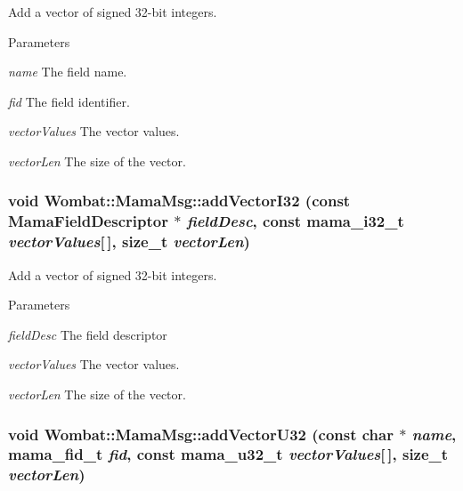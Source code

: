 Add a vector of signed 32-\/bit integers. 
\begin{DoxyParams}{Parameters}
\item[{\em name}]The field name. \item[{\em fid}]The field identifier. \item[{\em vectorValues}]The vector values. \item[{\em vectorLen}]The size of the vector. \end{DoxyParams}
\hypertarget{classWombat_1_1MamaMsg_a2d8be78e6c78a3a68d6f5d8dbcaedc6c}{
\subsubsection[{addVectorI32}]{\setlength{\rightskip}{0pt plus 5cm}void Wombat::MamaMsg::addVectorI32 (const {\bf MamaFieldDescriptor} $\ast$ {\em fieldDesc}, \/  const mama\_\-i32\_\-t {\em vectorValues}\mbox{[}$\,$\mbox{]}, \/  size\_\-t {\em vectorLen})}}
\label{classWombat_1_1MamaMsg_a2d8be78e6c78a3a68d6f5d8dbcaedc6c}


Add a vector of signed 32-\/bit integers. 
\begin{DoxyParams}{Parameters}
\item[{\em fieldDesc}]The field descriptor \item[{\em vectorValues}]The vector values. \item[{\em vectorLen}]The size of the vector. \end{DoxyParams}
\hypertarget{classWombat_1_1MamaMsg_a2beef7bf6074edca0b63be8477dce361}{
\subsubsection[{addVectorU32}]{\setlength{\rightskip}{0pt plus 5cm}void Wombat::MamaMsg::addVectorU32 (const char $\ast$ {\em name}, \/  mama\_\-fid\_\-t {\em fid}, \/  const mama\_\-u32\_\-t {\em vectorValues}\mbox{[}$\,$\mbox{]}, \/  size\_\-t {\em vectorLen})}}
\label{classWombat_1_1MamaMsg_a2beef7bf6074edca0b63be8477dce361}


